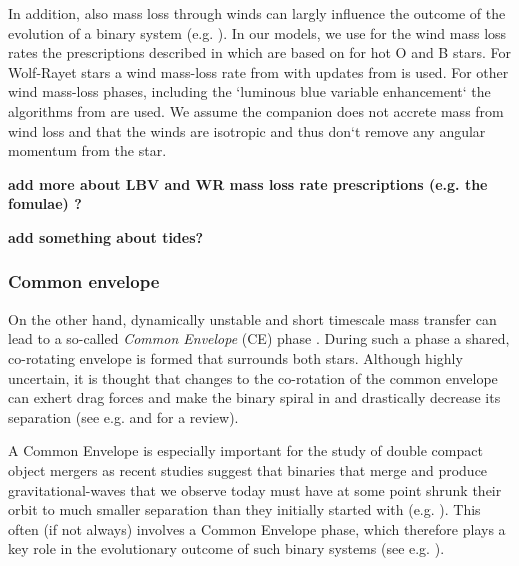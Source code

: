 \documentclass[a4paper,fleqn,usenatbib]{mnras}
\newcommand{\floor}[1]{\textbf{\textcolor{ochre}{#1}}}
\begin{document}
In addition, also mass loss through winds can largly influence the outcome of the evolution of a binary system (e.g. \citealt{renzo2017systematic}). In our models, we use for the wind mass loss rates the prescriptions described in \citep{de2013rotation} which are based on \citep{vink2000new,vink2001mass} for hot O and B stars. For Wolf-Rayet stars a wind mass-loss rate from \citet{hamann1998spectrum} with updates from \citet{belczynski2010effect} is used.  For other wind mass-loss phases, including the `luminous blue variable enhancement` the algorithms from \citet{hurley2000comprehensive} are used. We assume the companion does not accrete mass from wind loss and that the winds are isotropic and thus don`t remove any angular momentum from the star.

\floor{add more about LBV and WR mass loss rate prescriptions (e.g. the fomulae) ?}  
%


\floor{add something about tides?}


\subsubsection{Common envelope} 
On the other hand, dynamically unstable and short timescale mass transfer can lead to a so-called \emph{Common Envelope} (CE) phase \citep{paczynski1976common}.  During such a phase a shared, co-rotating envelope is formed that surrounds both stars. Although highly uncertain, it is thought that changes to the co-rotation of the common envelope can exhert drag forces and make the binary spiral in and drastically decrease its separation (see e.g. \citealt{murguia2017accretion, macleod2017common} and \citealt{ivanova2013common} for a review).  

A Common Envelope is especially important for the study of double compact object mergers as recent studies suggest that binaries that merge and produce gravitational-waves that we observe today must have at some point shrunk their orbit to much smaller separation than they initially started with (e.g. \citealt{kalogera2007formation,abbott2016astrophysical} ). This often  (if not always) involves a Common Envelope phase, which therefore plays a key role in the evolutionary outcome of such binary systems (see e.g. \citealt{iben1993common,taam2000common,taam2010common}). 
\end{document}

